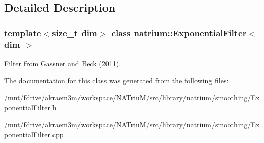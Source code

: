 \subsection{Detailed Description}
\subsubsection*{template$<$size\_\-t dim$>$ class natrium::ExponentialFilter$<$ dim $>$}

\hyperlink{classnatrium_1_1Filter}{Filter} from Gassner and Beck (2011). 

The documentation for this class was generated from the following files:\begin{DoxyCompactItemize}
\item 
/mnt/fdrive/akraem3m/workspace/NATriuM/src/library/natrium/smoothing/ExponentialFilter.h\item 
/mnt/fdrive/akraem3m/workspace/NATriuM/src/library/natrium/smoothing/ExponentialFilter.cpp\end{DoxyCompactItemize}
